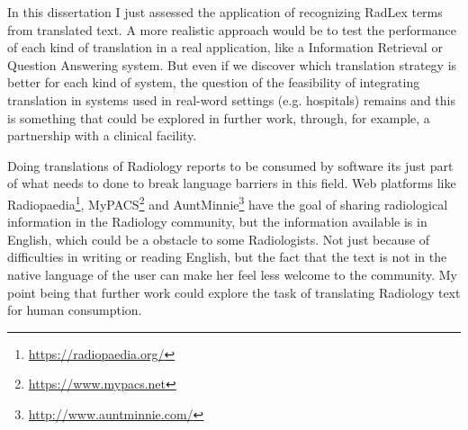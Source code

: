 In this dissertation I just assessed the application of recognizing RadLex terms from translated text. A more realistic approach would be to test the performance of each kind of translation in a real application, like a Information Retrieval \citep{Manning2009b} or Question Answering system. But even if we discover which translation strategy is better for each kind of system, the question of the feasibility of integrating translation in systems used in real-word settings (e.g. hospitals) remains and this is something that could be explored in further work, through, for example, a partnership with a clinical facility.

Doing translations of Radiology reports to be consumed by software its just part of what needs to done to break language barriers in this field. Web platforms like Radiopaedia\footnote{\url{https://radiopaedia.org/}}, MyPACS\footnote{\url{https://www.mypacs.net}} and AuntMinnie\footnote{\url{http://www.auntminnie.com/}} have the goal of sharing radiological information in the Radiology community, but the information available is in English, which could be a obstacle to some Radiologists. Not just because of difficulties in writing or reading English, but the fact that the text is not in the native language of the user can make her feel less welcome to the community. My point being that further work could explore the task of translating Radiology text for human consumption.